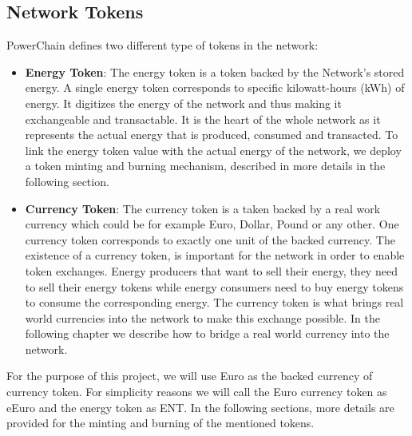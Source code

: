 \subsection{Network Tokens}
PowerChain defines two different type of tokens in the network:
\begin{itemize}
    \item \textbf{Energy Token}: The energy token is a token backed by the Network's stored energy. A single energy token corresponds to specific kilowatt-hours (kWh) of energy. It digitizes the energy of the network and thus making 
    it exchangeable and transactable. It is the heart of the whole network as it represents the actual energy that is produced, consumed and transacted. To link the energy token value with the actual energy of the network, we deploy
    a token minting and burning mechanism, described in more details in the following section.
    \item \textbf{Currency Token}: The currency token is a taken backed by a real work currency which could be for example Euro, Dollar, Pound or any other. One currency token corresponds to exactly one unit of the backed currency.
    The existence of a currency token, is important for the network in order to enable token exchanges. Energy producers that want to sell their energy, they need to sell their energy tokens while energy consumers need to buy energy
    tokens to consume the corresponding energy. The currency token is what brings real world currencies into the network to make this exchange possible. In the following chapter we describe how to bridge a real world currency into the
    network.
\end{itemize}
For the purpose of this project, we will use Euro as the backed currency of currency token. For simplicity reasons we will call the Euro currency token as eEuro and the energy token as ENT.
In the following sections, more details are provided for the minting and burning of the mentioned tokens.\\

